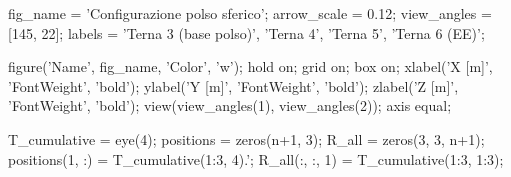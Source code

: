 \documentclass[11pt, a4paper]{article}
\begin{document}

\begin{matlabcode}
fig_name    = 'Configurazione polso sferico';
arrow_scale = 0.12;
view_angles = [145, 22];
labels      = {'Terna 3 (base polso)', 'Terna 4', 'Terna 5', 'Terna 6 (EE)'};

figure('Name', fig_name, 'Color', 'w');
hold on;
grid on;
box on;
xlabel('X [m]', 'FontWeight', 'bold');
ylabel('Y [m]', 'FontWeight', 'bold');
zlabel('Z [m]', 'FontWeight', 'bold');
view(view_angles(1), view_angles(2));
axis equal;

T_cumulative = eye(4);
positions = zeros(n+1, 3);
R_all     = zeros(3, 3, n+1);
positions(1, :) = T_cumulative(1:3, 4).';
R_all(:, :, 1)  = T_cumulative(1:3, 1:3);
\end{matlabcode}
\newpage
\end{document}
